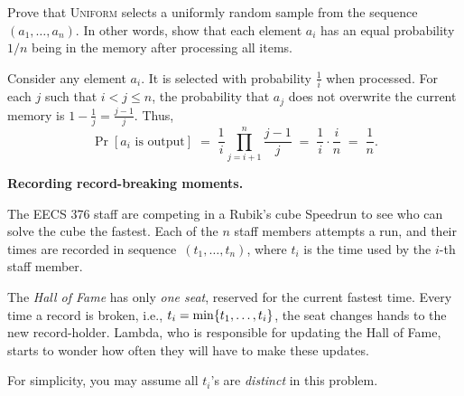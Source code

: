 \documentclass[11pt,addpoints,answers]{exam}
\begin{document}
\begin{questions}
    Prove that \textsc{Uniform} selects a uniformly random sample from the sequence $(a_1, \ldots, a_n)$. In other words, show that each element $a_i$ has an equal probability $1/n$ being in the memory after processing all items.
    

    \begin{solution} 
      Consider any element \(a_i\). It is selected with probability \(\frac{1}{i}\) when processed. For each \(j\) such that \(i<j\le n\), the probability that \(a_j\) does not overwrite the current memory is \(1-\frac{1}{j}=\frac{j-1}{j}\). Thus, 
      \[ \Pr[a_i\text{ is output}] \;=\; \frac{1}{i}\prod_{j=i+1}^{n}\frac{j-1}{j}\;=\; \frac{1}{i}\cdot\frac{i}{n}\;=\; \frac{1}{n}.\]
    \end{solution}


\pagebreak
\question \textbf{Recording record-breaking moments.}

The EECS 376 staff are competing in a Rubik's cube Speedrun to see who can solve the cube the fastest. Each of the $n$ staff members attempts a run, and their times are recorded in sequence~$(t_1, \ldots, t_n)$, where $t_i$ is the time used by the $i$-th staff member.

The \emph{Hall of Fame} has only \emph{one seat}, reserved for the current fastest time. Every time a record is broken, i.e., $t_i = \min\{t_1, \ldots, t_i\}$, the seat changes hands to the new record-holder. Lambda, who is responsible for updating the Hall of Fame, starts to wonder how often they will have to make these updates. 

For simplicity, you may assume all $t_i$'s are \emph{distinct} in this problem. 

\end{questions}
\end{document}
